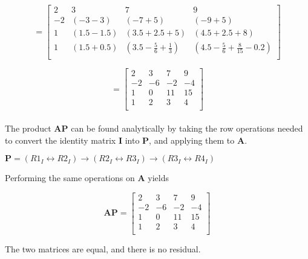 \documentclass[11pt]{article}
\begin{document}
\begin{enumerate}
\begin{enumerate}[(a)]
				\[
					=
					\begin{bmatrix}
						2 & 3 & 7 & 9 \\
						-2 & (-3-3) & (-7+5) & (-9+5) \\
						1 & (1.5-1.5) & (3.5 + 2.5 + 5) & (4.5 + 2.5 + 8) \\
						1 & (1.5 + 0.5) & (3.5 - \frac{5}{6} + \frac{1}{3}) & (4.5 - \frac{5}{6} + \frac{8}{15} -0.2)\\
					\end{bmatrix}
				\]

				\[
					=
					\begin{bmatrix}
						2 & 3 & 7 & 9 \\
						-2 & -6 & -2 & -4 \\
						1 & 0 & 11 & 15 \\
						1 & 2 & 3 & 4 \\
					\end{bmatrix}
				\] \\

				The product $\mathbf{AP}$ can be found analytically by taking the row operations needed to convert the identity
				matrix $\mathbf{I}$ into $\mathbf{P}$, and applying them to $\mathbf{A}$.

				$\mathbf{P} = (R1_I \leftrightarrow R2_I) \to (R2_I \leftrightarrow R3_I) \to (R3_I \leftrightarrow R4_I)$

				Performing the same operations on $\mathbf{A}$ yields

				\[
					\mathbf{AP}=
					\begin{bmatrix}
						2 & 3 & 7 & 9 \\
						-2 & -6 & -2 & -4 \\
						1 & 0 & 11 & 15 \\
						1 & 2 & 3 & 4 \\
					\end{bmatrix}
				\]

				The two matrices are equal, and there is no residual. \\

		\end{enumerate}


\end{enumerate}
\end{document}
